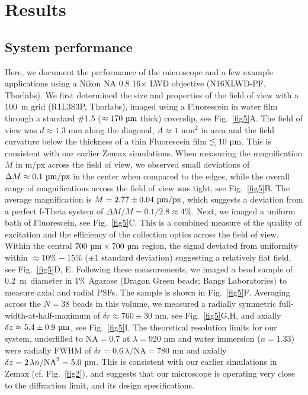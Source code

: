 \documentclass[10pt,letterpaper]{article}
\newcommand{\microns}{~\textmu m~} %
\begin{document}
\section*{Results}

\subsection*{System performance}
%
Here, we document the performance of the microscope and a few example applications using a Nikon NA 0.8 16$\times$ LWD objective (N16XLWD-PF, Thorlabs). We first determined the size and properties of the field of view with a 100~\textmu m grid (R1L3S3P, Thorlabs), imaged using a Fluorescein in water film through a standard \#1.5 ($\approx170\text{ \textmu m}$ thick) coverslip, see Fig.~\ref{fig5}A. The field of view was $d\approx1.3\text{ mm}$ along the diagonal, $A\approx 1\text{ mm}^2$ in area and the field curvature below the thickness of a thin Fluorescein film $\lesssim 10\text{ \textmu m}$. This is consistent with our earlier Zemax simulations. When measuring the magnification $M$ in \textmu m/px across the field of view, we observed small deviations of $\Delta M \approx 0.1\text{ \textmu m/px}$ in the center when compared to the edges, while the overall range of magnifications across the field of view was tight, see Fig.~\ref{fig5}B. The average magnification is $M=2.77\pm0.04\text{ \textmu m/px}$, which suggests a deviation from a perfect f-Theta system of $\Delta M/M = 0.1/2.8 \approx 4\%$. Next, we imaged a uniform bath of Fluorescein, see Fig.~\ref{fig5}C. This is a combined measure of the quality of excitation and the efficiency of the collection optics across the field of view. Within the central $700\text{ \textmu m} \times 700\text{ \textmu m}$ region, the signal deviated from uniformity within $\approx 10\%-15\%$ ($\pm 1 \text{ standard deviation}$) suggesting a relatively flat field, see Fig.~\ref{fig5}D, E. Following these measurements, we imaged a bead sample of 0.2\microns diameter in 1\% Agarose (Dragon Green beads; Bangs Laboratories) to measure axial and radial PSFs. The sample is shown in Fig.~\ref{fig5}F. Averaging across the $N=38$ beads in this volume, we measured a radially symmetric full-width-at-half-maximum of $\delta r\approx760\pm30\text{ nm}$, see Fig.~\ref{fig5}G,H, and axially $\delta z \approx 5.4\pm0.9\text{ \textmu m}$, see Fig.~\ref{fig5}I. The theoretical resolution limits\cite{Tsai2002} for our system, underfilled to $\text{NA}=0.7$ at $\lambda=920\text{ nm}$ and water immersion ($n=1.33$) were radially FWHM of $\delta r=0.6\,\lambda/\text{NA}=780\text{ nm}$ and axially $\delta z = 2\,\lambda n/\text{NA}^2=5.0\text{ \textmu m}$. This is consistent with our earlier simulations in Zemax (cf. Fig.~\ref{fig2}), and suggests that our microscope is operating very close to the diffraction limit, and its design specifications.
\end{document}
